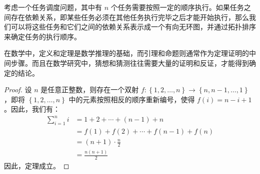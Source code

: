 \begin{exmp}
  考虑一个任务调度问题，其中有 $n$ 个任务需要按照一定的顺序执行。如果任务之间存在依赖关系，即某些任务必须在其他任务执行完毕之后才能开始执行，那么我们可以将这些任务和它们之间的依赖关系表示成一个有向无环图，并通过拓扑排序来确定任务的执行顺序。
\end{exmp}

\begin{rem}
  在数学中，定义和定理是数学推理的基础，而引理和命题则通常作为定理证明的中间步骤。而且在数学研究中，猜想和猜测往往需要大量的证明和反证，才能得到确定的结论。
\end{rem}

\begin{proof}
  设 $n$ 是任意正整数，则存在一个双射 $f: \left\{1,2,\dots,n\right\} \rightarrow \left\{n,n-1,\dots,1\right\}$，即将 $\left\{1,2,\dots,n\right\}$ 中的元素按照相反的顺序重新编号，使得 $f(i) = n-i+1$。因此，我们有：
  \begin{align*}
    \sum_{i=1}^n i & = 1 + 2 + \cdots + (n-1) + n           \\
                   & = f(1) + f(2) + \cdots + f(n-1) + f(n) \\
                   & = (n+1) \cdot \frac{n}{2}              \\
                   & = \frac{n(n+1)}{2}
  \end{align*}
  因此，定理成立。
\end{proof}
